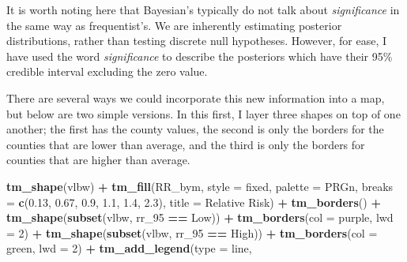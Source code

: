 \documentclass[
]{book}
\newenvironment{Shaded}{\begin{snugshade}}{\end{snugshade}}
\newcommand{\AttributeTok}[1]{\textcolor[rgb]{0.13,0.29,0.53}{#1}}
\newcommand{\DecValTok}[1]{\textcolor[rgb]{0.00,0.00,0.81}{#1}}
\newcommand{\FloatTok}[1]{\textcolor[rgb]{0.00,0.00,0.81}{#1}}
\newcommand{\FunctionTok}[1]{\textcolor[rgb]{0.13,0.29,0.53}{\textbf{#1}}}
\newcommand{\NormalTok}[1]{#1}
\newcommand{\SpecialCharTok}[1]{\textcolor[rgb]{0.81,0.36,0.00}{\textbf{#1}}}
\newcommand{\StringTok}[1]{\textcolor[rgb]{0.31,0.60,0.02}{#1}}
\begin{document}
It is worth noting here that Bayesian's typically do not talk about \emph{significance} in the same way as frequentist's. We are inherently estimating posterior distributions, rather than testing discrete null hypotheses. However, for ease, I have used the word \emph{significance} to describe the posteriors which have their 95\% credible interval excluding the zero value.

There are several ways we could incorporate this new information into a map, but below are two simple versions. In this first, I layer three shapes on top of one another; the first has the county values, the second is only the borders for the counties that are lower than average, and the third is only the borders for counties that are higher than average.

\begin{Shaded}
\begin{Highlighting}[]
\FunctionTok{tm\_shape}\NormalTok{(vlbw) }\SpecialCharTok{+}
  \FunctionTok{tm\_fill}\NormalTok{(}\StringTok{\textquotesingle{}RR\_bym\textquotesingle{}}\NormalTok{,}
          \AttributeTok{style =} \StringTok{\textquotesingle{}fixed\textquotesingle{}}\NormalTok{,}
          \AttributeTok{palette =} \StringTok{\textquotesingle{}PRGn\textquotesingle{}}\NormalTok{,}
          \AttributeTok{breaks =} \FunctionTok{c}\NormalTok{(}\FloatTok{0.13}\NormalTok{, }\FloatTok{0.67}\NormalTok{, }\FloatTok{0.9}\NormalTok{, }\FloatTok{1.1}\NormalTok{, }\FloatTok{1.4}\NormalTok{, }\FloatTok{2.3}\NormalTok{),}
          \AttributeTok{title =} \StringTok{\textquotesingle{}Relative Risk\textquotesingle{}}\NormalTok{) }\SpecialCharTok{+}
  \FunctionTok{tm\_borders}\NormalTok{() }\SpecialCharTok{+} 
\FunctionTok{tm\_shape}\NormalTok{(}\FunctionTok{subset}\NormalTok{(vlbw, rr\_95 }\SpecialCharTok{==} \StringTok{\textquotesingle{}Low\textquotesingle{}}\NormalTok{)) }\SpecialCharTok{+} 
  \FunctionTok{tm\_borders}\NormalTok{(}\AttributeTok{col =} \StringTok{\textquotesingle{}purple\textquotesingle{}}\NormalTok{, }\AttributeTok{lwd =} \DecValTok{2}\NormalTok{) }\SpecialCharTok{+}
\FunctionTok{tm\_shape}\NormalTok{(}\FunctionTok{subset}\NormalTok{(vlbw, rr\_95 }\SpecialCharTok{==} \StringTok{\textquotesingle{}High\textquotesingle{}}\NormalTok{)) }\SpecialCharTok{+} 
  \FunctionTok{tm\_borders}\NormalTok{(}\AttributeTok{col =} \StringTok{\textquotesingle{}green\textquotesingle{}}\NormalTok{, }\AttributeTok{lwd =} \DecValTok{2}\NormalTok{) }\SpecialCharTok{+}
  \FunctionTok{tm\_add\_legend}\NormalTok{(}\AttributeTok{type =} \StringTok{\textquotesingle{}line\textquotesingle{}}\NormalTok{, }

\end{Highlighting}
\end{Shaded}
\end{document}
